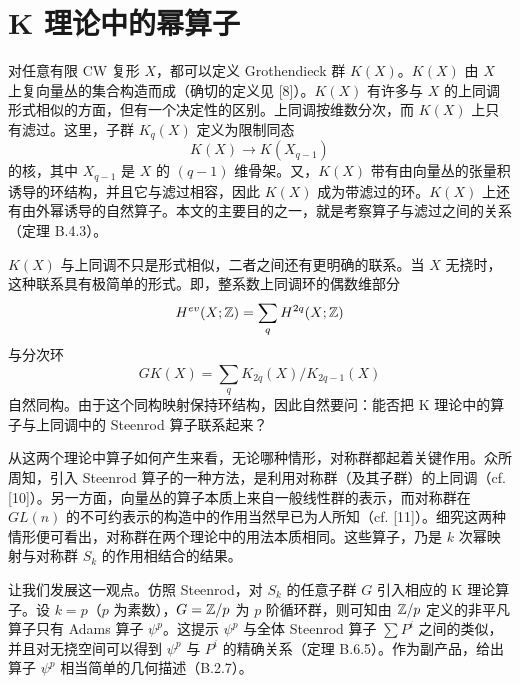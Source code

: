\chapter[K 理论中的幂算子]{K 理论中的幂算子\footnotemark}


对任意有限 CW 复形 $X$，都可以定义 Grothendieck 群 $K(X)$。$K(X)$ 由 $X$ 上复向量丛的集合构造而成（确切的定义见 [8]）。$K(X)$ 有许多与 $X$ 的上同调形式相似的方面，但有一个决定性的区别。上同调按维数分次，而 $K(X)$ 上只有滤过。这里，子群 $K_q(X)$ 定义为限制同态
\[
  K(X)\longrightarrow K(X_{q-1})
\]
的核，其中 $X_{q-1}$ 是 $X$ 的 $(q-1)$ 维骨架。又，$K(X)$ 带有由向量丛的张量积诱导的环结构，并且它与滤过相容，因此 $K(X)$ 成为带滤过的环。$K(X)$ 上还有由外幂诱导的自然算子。本文的主要目的之一，就是考察算子与滤过之间的关系（定理 B.4.3）。


$K(X)$ 与上同调不只是形式相似，二者之间还有更明确的联系。当 $X$ 无挠时，这种联系具有极简单的形式。即，整系数上同调环的偶数维部分
\[
  H^{ev}(X;\mathbb{Z}) = \sum_q H^{2q}(X;\mathbb{Z})
\]
与分次环
\[
  GK(X) = \sum_q K_{2q}(X)/K_{2q-1}(X)
\]
自然同构。由于这个同构映射保持环结构，因此自然要问：能否把 K 理论中的算子与上同调中的 Steenrod 算子联系起来？

从这两个理论中算子如何产生来看，无论哪种情形，对称群都起着关键作用。众所周知，引入 Steenrod 算子的一种方法，是利用对称群（及其子群）的上同调（cf. [10]）。另一方面，向量丛的算子本质上来自一般线性群的表示，而对称群在 $GL(n)$ 的不可约表示的构造中的作用当然早已为人所知（cf. [11]）。细究这两种情形便可看出，对称群在两个理论中的用法本质相同。这些算子，乃是 $k$ 次幂映射与对称群 $S_k$ 的作用相结合的结果。


让我们发展这一观点。仿照 Steenrod，对 $S_k$ 的任意子群 $G$ 引入相应的 K 理论算子。设 $k=p$（$p$ 为素数），$G=\mathbb{Z}/p$ 为 $p$ 阶循环群，则可知由 $\mathbb{Z}/p$ 定义的非平凡算子只有 Adams 算子 $\psi^p$。这提示 $\psi^p$ 与全体 Steenrod 算子 $\sum P^i$ 之间的类似，并且对无挠空间可以得到 $\psi^p$ 与 $P^i$ 的精确关系（定理 B.6.5）。作为副产品，给出算子 $\psi^p$ 相当简单的几何描述（B.2.7）。

